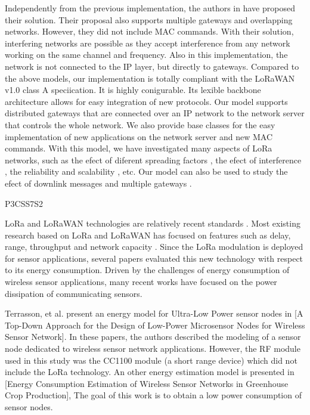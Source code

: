 Independently from the previous implementation,
	the authors in \cite{abeele_scalability_2017} have proposed their solution.
Their proposal also supports multiple gateways and overlapping networks.
However,
	they did not include MAC commands.
With their solution,
	interfering networks are possible as they accept interference from any network working on the same channel and frequency.
Also in this implementation,
	the network is not connected to the IP layer,
	but directly to gateways.
Compared to the above models,
	our implementation is totally compliant with the LoRaWAN v1.0 class A speciication.
It is highly conigurable.
Its lexible backbone architecture allows for easy integration of new protocols.
Our model supports distributed gateways that are connected over an IP network to the network server that controls the whole network.
We also provide base classes for the easy implementation of new applications on the network server and new MAC commands.
With this model,
	we have investigated many aspects of LoRa networks,
	such as the efect of diferent spreading factors \cite{reynders_power_2017},
	the efect of interference \cite{reynders_range_2016},
	the reliability and scalability \cite{reynders_improving_2018},
	etc.
Our model can also be used to study the efect of downlink messages \cite{pop_does_2017} and multiple gateways \cite{abeele_scalability_2017} \cite{voigt_mitigating_2016}.

\cite{bouguera_energy_2018} P3CSS7S2

LoRa and LoRaWAN technologies are relatively recent standards \cite{augustin_study_2016}.
Most existing research based on LoRa and LoRaWAN has focused on features such as delay,
	range,
	throughput and network capacity \cite{bor_lora_2017} \cite{augustin_study_2016}\cite{jetmir_haxhibeqiri_lora_2017}\cite{nolan_evaluation_2016}.
Since the LoRa modulation is deployed for sensor applications,
	several papers evaluated this new technology with respect to its energy consumption.
Driven by the challenges of energy consumption of wireless sensor applications,
	many recent works have focused on the power dissipation of communicating sensors.

Terrasson,
	et al.
present an energy model for Ultra-Low Power sensor nodes in \cite{terrasson_system_2014} [A Top-Down Approach for the Design of Low-Power Microsensor Nodes for Wireless Sensor Network].
In these papers,
	the authors described the modeling of a sensor node dedicated to wireless sensor network applications.
However,
	the RF module used in this study was the CC1100 module (a short range device) which did not include the LoRa technology.
An other energy estimation model is presented in [Energy Consumption Estimation of Wireless Sensor Networks in Greenhouse Crop Production],
	The goal of this work is to obtain a low power consumption of sensor nodes.

